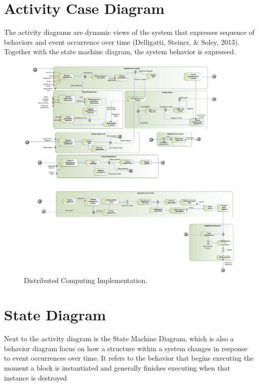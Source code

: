 \documentclass{article}
\begin{document}
{            \section{Activity Case Diagram}
            The activity diagrams are dynamic views of the system that expresses sequence of
            behaviors and event occurrence over time (Delligatti, Steiner, & Soley, 2013). Together
            with the state machine diagram, the system behavior is expressed.
            \begin{figure}[H]
                \centering 
                \includegraphics[width=1\linewidth]{./img/Activity.png}
                \caption{Distributed Computing Implementation.}
                \label{fig:architecture}
            \end{figure}
            \section{State Diagram}
           
            Next to the activity diagram is the State Machine Diagram, which is also a behavior
            diagram focus on how a structure within a system changes in response to event
            occurrences over time. It refers to the behavior that begins executing the moment a block
            is instantiated and generally finishes executing when that instance is destroyed
    
}
\end{document}
